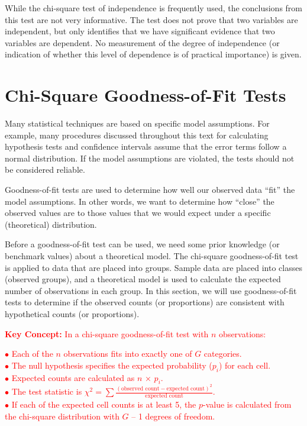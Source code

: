 \documentclass[
]{report}
\begin{document}
While the chi-square test of independence is frequently used, the conclusions from this test are not very
informative. The test does not prove that two variables are independent, but only identifies that we have
significant evidence that two variables are dependent. No measurement of the degree of independence (or
indication of whether this level of dependence is of practical importance) is given.

\section{\texorpdfstring{\textbf{Chi-Square Goodness-of-Fit Tests}}{Chi-Square Goodness-of-Fit Tests}}\label{chi-square-goodness-of-fit-tests}

Many statistical techniques are based on specific model assumptions. For example, many procedures discussed throughout this text for calculating hypothesis tests and confidence intervals assume that the error terms follow a normal distribution. If the model assumptions are violated, the tests should not be considered reliable.

Goodness-of-fit tests are used to determine how well our observed data ``fit'' the model assumptions. In other words, we want to determine how ``close'' the observed values are to those values that we would expect under a specific (theoretical) distribution.

Before a goodness-of-fit test can be used, we need some prior knowledge (or benchmark values) about a theoretical model. The chi-square goodness-of-fit test is applied to data that are placed into groups. Sample data are placed into classes (observed groups), and a theoretical model is used to calculate the expected number of observations in each group. In this section, we will use goodness-of-fit tests to determine if the observed counts (or proportions) are consistent with hypothetical counts (or proportions).

\Large

\textbf{\textcolor{red}{Key Concept:}}
\textcolor{red}{In a chi-square goodness-of-fit test with $n$ observations:}

\textcolor{red}{$\bullet$ Each of the $n$ observations fits into exactly one of $G$ categories.}\\
\textcolor{red}{$\bullet$ The null hypothesis specifies the expected probability ($p_i$) for each cell.}\\
\textcolor{red}{$\bullet$ Expected counts are calculated as $n$ × $p_i$.}\\
\textcolor{red}{$\bullet$ The test statistic is $\chi^2 = \sum \frac{(\text{observed count} - \text{expected count})^2}{\text{expected count}}$.}\\
\textcolor{red}{$\bullet$ If each of the expected cell counts is at least 5, the $p$-value is calculated from the chi-square distribution with $G$ – 1 degrees of freedom.}
\normalsize
\end{document}
